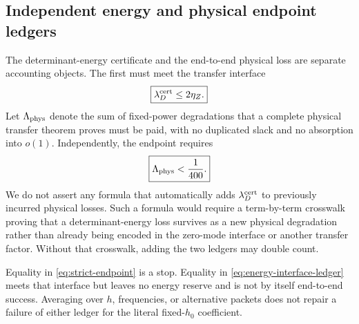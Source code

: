 \subsection{Independent energy and physical endpoint ledgers}

The determinant-energy certificate and the end-to-end physical loss
are separate accounting objects.  The first must meet the transfer
interface
\begin{equation}
 \boxed{\lambda_D^{\rm cert}\le2\eta_Z.}
\label{eq:energy-interface-ledger}
\end{equation}
Let \(\Lambda_{\rm phys}\) denote the sum of fixed-power degradations
that a complete physical transfer theorem proves must be paid, with
no duplicated slack and no absorption into \(o(1)\).  Independently,
the endpoint requires
\begin{equation}
 \boxed{\Lambda_{\rm phys}<\frac1{400}.}
\label{eq:strict-endpoint}
\end{equation}
We do not assert any formula that automatically adds
\(\lambda_D^{\rm cert}\) to previously incurred physical losses.
Such a formula would require a term-by-term crosswalk proving that a
determinant-energy loss survives as a new physical degradation rather
than already being encoded in the zero-mode interface or another
transfer factor.  Without that crosswalk, adding the two ledgers may
double count.

Equality in \eqref{eq:strict-endpoint} is a stop.  Equality in
\eqref{eq:energy-interface-ledger} meets that interface but leaves no
energy reserve and is not by itself end-to-end success.  Averaging
over \(h\), frequencies, or alternative packets does not repair a
failure of either ledger for the literal fixed-\(h_0\) coefficient.
